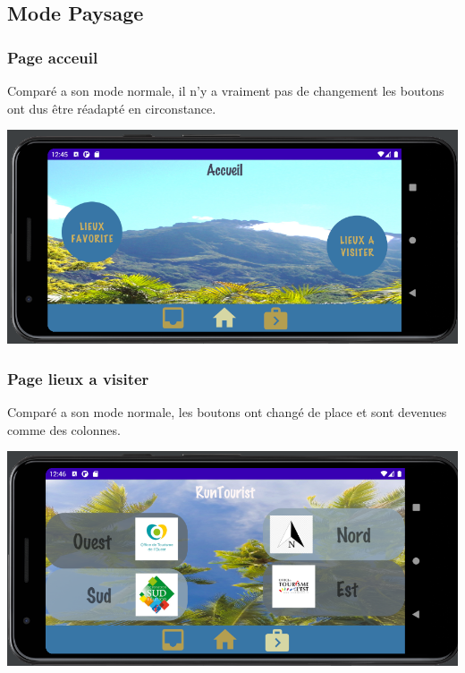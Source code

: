 \documentclass{article}
\begin{document}
{\color{olive}\subsection{ Mode Paysage}}
{\color{purple}\subsubsection{Page acceuil}}
\begin{minipage}{0.5\textwidth}
 Comparé a son mode normale, il n'y a vraiment pas de changement les boutons ont dus être réadapté en circonstance. 
\end{minipage}
\hfill
\begin{minipage}{0.4\textwidth}
    \includegraphics[width=\textwidth]{Acceuil_p}
    
\end{minipage}

{\color{purple}\subsubsection{Page lieux a visiter}}
\begin{minipage}{0.5\textwidth}
 Comparé a son mode normale, les boutons ont changé de place et sont devenues comme des colonnes. 
\end{minipage}
\hfill
\begin{minipage}{0.4\textwidth}
\includegraphics[width=\textwidth]{Lieux_a_visiter_p}
\end{minipage}
    
\end{document}
